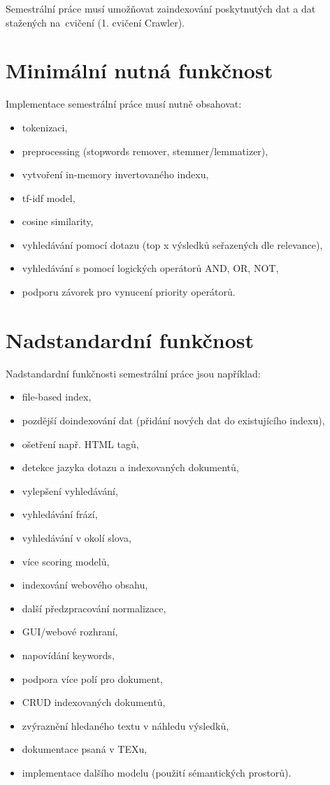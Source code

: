 \documentclass[
11pt,
a4paper,
pdftex,
czech,
titlepage
]{report}
\begin{document}
Semestrální práce musí umožňovat zaindexování poskytnutých dat a dat stažených na~cvičení (1. cvičení Crawler).

\section{Minimální nutná funkčnost}\label{min_func}
Implementace semestrální práce musí nutně obsahovat:
\begin{itemize}
    \item tokenizaci,
    \item preprocessing (stopwords remover, stemmer/lemmatizer),
    \item vytvoření in-memory invertovaného indexu,
    \item tf-idf model,
    \item cosine similarity,
    \item vyhledávání pomocí dotazu (top x výsledků seřazených dle relevance),
    \item vyhledávání s pomocí logických operátorů AND, OR, NOT,
    \item podporu závorek pro vynucení priority operátorů.
\end{itemize}

\section{Nadstandardní funkčnost}\label{adv_func}
Nadstandardní funkčnosti semestrální práce jsou například:
\begin{itemize}
    \item file-based index,
    \item pozdější doindexování dat (přidání nových dat do existujícího indexu),
    \item ošetření např. HTML tagů,
    \item detekce jazyka dotazu a indexovaných dokumentů,
    \item vylepšení vyhledávání,
    \item vyhledávání frází,
    \item vyhledávání v okolí slova,
    \item více scoring modelů,
    \item indexování webového obsahu,
    \item další předzpracování normalizace,
    \item GUI/webové rozhraní,
    \item napovídání keywords,
    \item podpora více polí pro dokument,
    \item CRUD indexovaných dokumentů,
    \item zvýraznění hledaného textu v náhledu výsledků,
    \item dokumentace psaná v TEXu,
    \item implementace dalšího modelu (použití sémantických prostorů).
\end{itemize}
\end{document}
